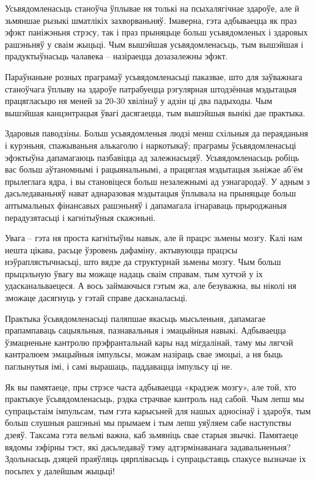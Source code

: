 Усьвядомленасьць станоўча ўплывае ня толькі на псыхалягічнае здароўе, але й зьмяншае рызыкі шматлікіх захворваньняў. Імаверна, гэта адбываецца як праз эфэкт паніжэньня стрэсу, так і праз прыняцьце больш усьвядомленых і здаровых рашэньняў у сваім жыцьці. Чым вышэйшая усьвядомленасьць, тым вышэйшая і прадуктыўнасьць чалавека – назіраецца дозазалежны эфэкт.

Параўнаньне розных праграмаў усьвядомленасьці паказвае, што для заўважнага станоўчага ўплыву на здароўе патрабуецца рэгулярная штодзённая мэдытацыя працягласьцю ня меней за 20-30 хвілінаў у адзін ці два падыходы. Чым вышэйшая канцэнтрацыя ўвагі дасягаецца, тым вышэйшыя вынікі дае практыка.

Здаровыя паводзіны. Больш усьвядомленыя людзі менш схільныя да пераяданьня і курэньня, спажываньня алькаголю і наркотыкаў; праграмы ўсьвядомленасьці эфэктыўна дапамагаюць пазбавіцца ад залежнасьцяў. Усьвядомленасьць робіць вас больш аўтаномнымі і рацыянальнымі, а працяглая мэдытацыя зьніжае аб'ём прылеглага ядра, і вы становіцеся больш незалежнымі ад узнагародаў. У адным з дасьледаваньняў нават аднаразовая мэдытацыя ўплывала на прыняцьце больш аптымальных фінансавых рашэньняў і дапамагала ігнараваць прыроджаныя перадузятасьці і кагнітыўныя скажэньні.

Увага – гэта ня проста кагнітыўны навык, але й працэс зьмены мозгу. Калі нам нешта цікава, расьце ўзровень дафаміну, актывуюцца працэсы нэўраплястычнасьці, што вядзе да структурнай зьмены мозгу. Чым больш прыцэльную ўвагу вы можаце надаць сваім справам, тым хутчэй у іх удасканальваецеся. А вось займаючыся гэтым жа, але безуважна, вы ніколі ня зможаце дасягнуць у гэтай справе дасканаласьці.

Практыка ўсьвядомленасьці паляпшае якасьць мысьленьня, дапамагае прапампаваць сацыяльныя, пазнавальныя і эмацыйныя навыкі. Адбываецца ўзмацненьне кантролю прэфрантальнай кары над мігдалінай, таму мы лягчэй кантралюем эмацыйныя імпульсы, можам назіраць свае эмоцыі, а ня быць паглынутыя імі, і самі вырашаць, паддавацца імпульсу ці не.

Як вы памятаеце, пры стрэсе часта адбываецца «крадзеж мозгу», але той, хто практыкуе ўсьвядомленасьць, рэдка страчвае кантроль над сабой. Чым лепш мы супрацьстаім імпульсам, тым гэта карысьней для нашых адносінаў і здароўя, тым больш слушныя рашэньні мы прымаем і тым лепш уяўляем сабе наступствы дзеяў. Таксама гэта вельмі важна, каб зьмяніць свае старыя звычкі. Памятаеце вядомы зэфірны тэст, які дасьледаваў тэму адтэрмінаванага задавальненьня? Здольнасьць дзяцей праяўляць цярплівасьць і супрацьстаяць спакусе вызначае іх посьпех у далейшым жыцьці!

